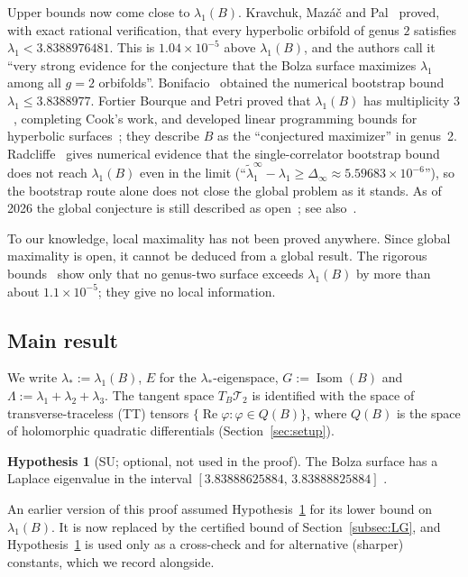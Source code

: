 \documentclass[11pt]{amsart}
\theoremstyle{definition}
\newtheorem{hypothesis}[theorem]{Hypothesis}
\theoremstyle{remark}
\newcommand{\Teich}{\mathcal{T}_2}
\newcommand{\Isom}{\operatorname{Isom}}
\newcommand{\ls}{\lambda_*}
\begin{document}
Upper bounds now come close to $\lambda_1(B)$. Kravchuk, Maz\'a\v{c} and Pal~\cite[Thm.~1.1]{KMP}
proved, with exact rational verification, that every hyperbolic orbifold of genus $2$ satisfies
$\lambda_1<3.8388976481$. This is $1.04\times10^{-5}$ above $\lambda_1(B)$, and the authors
call it ``very strong evidence for the conjecture that the Bolza surface maximizes $\lambda_1$
among all $g=2$ orbifolds''. Bonifacio~\cite{Bon22a,Bon22b} obtained the numerical bootstrap
bound $\lambda_1\le 3.8388977$. Fortier Bourque and Petri proved that $\lambda_1(B)$ has
multiplicity $3$~\cite[Thm.~7.1]{FBP-K}, completing Cook's work, and developed linear
programming bounds for hyperbolic surfaces~\cite{FBP-LP}; they describe $B$ as the
``conjectured maximizer'' in genus~2. Radcliffe~\cite{Rad} gives numerical evidence that the
single-correlator bootstrap bound does not reach $\lambda_1(B)$ even in the limit
(``$\tilde\lambda_1^\infty-\lambda_1\ge\Delta_\infty\approx5.59683\times10^{-6}$''), so the
bootstrap route alone does not close the global problem as it stands. As of 2026 the global
conjecture is still described as open~\cite{HP,FBP-LP,Bon22b}; see also~\cite{PetriHDR,GPSX}.

To our knowledge, local maximality has not been proved anywhere. Since global maximality is
open, it cannot be deduced from a global result. The rigorous bounds~\cite{KMP,SU13} show only
that no genus-two surface exceeds $\lambda_1(B)$ by more than about $1.1\times10^{-5}$; they
give no local information.

\subsection{Main result}
We write $\ls:=\lambda_1(B)$, $E$ for the $\ls$-eigenspace, $G:=\Isom(B)$ and
$\Lambda:=\lambda_1+\lambda_2+\lambda_3$. The tangent space $T_B\Teich$ is identified with the
space of transverse-traceless (TT) tensors $\{\operatorname{Re}\varphi:\varphi\in Q(B)\}$, where
$Q(B)$ is the space of holomorphic quadratic differentials (Section~\ref{sec:setup}).

\begin{hypothesis}[SU; optional, not used in the proof]\label{hyp:SU}
The Bolza surface has a Laplace eigenvalue in the interval
$[3.83888625884,\,3.83888825884]$ \cite[\S5]{SU13}.
\end{hypothesis}
An earlier version of this proof assumed Hypothesis~\ref{hyp:SU} for its lower bound on
$\lambda_1(B)$. It is now replaced by the certified bound of Section~\ref{subsec:LG}, and
Hypothesis~\ref{hyp:SU} is used only as a cross-check and for alternative (sharper) constants,
which we record alongside.
\end{document}
